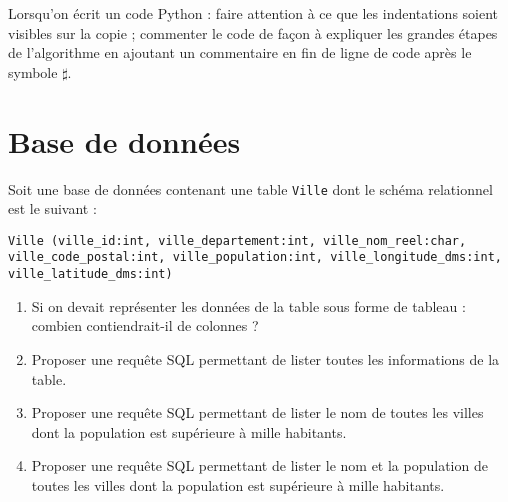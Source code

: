 
\parindent=10pt
\textheight 250mm

  \pagestyle{fancy}



 \begin{center}
  \begin{large}
  \end{large}
 \end{center}

\begin{boxedminipage}{\textwidth} 
Lorsqu'on écrit un code Python : faire attention à ce que les indentations soient visibles sur la copie ; commenter le code de façon à expliquer les grandes étapes de l'algorithme en ajoutant un commentaire en fin de ligne de code après le symbole $\sharp$.
\end{boxedminipage}
 
\section{Base de données}

Soit une base de données contenant une table \texttt{Ville} dont le schéma relationnel est le suivant : 

\noindent\texttt{Ville (ville\_id:int, ville\_departement:int, ville\_nom\_reel:char, ville\_code\_postal:int, ville\_population:int, ville\_longitude\_dms:int, ville\_latitude\_dms:int)}

\begin{enumerate}
\item Si on devait représenter les données de la table sous forme de tableau : combien contiendrait-il de colonnes ?                                                                                                            
\item Proposer une requête SQL permettant de lister toutes les informations de la table.
\item Proposer une requête SQL permettant de lister le nom de toutes les villes dont la population est supérieure à mille habitants.
\item Proposer une requête SQL permettant de lister le nom et la population de toutes les villes dont la population est supérieure à mille habitants.
\end{enumerate}

